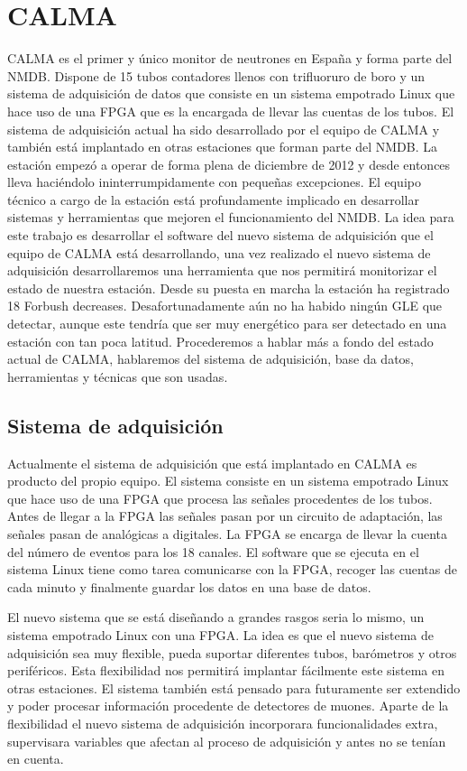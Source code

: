 \section{CALMA}
	CALMA\cite{Medina2013} es el primer y único monitor de neutrones en España y forma parte del NMDB. Dispone de 15 tubos contadores llenos con trifluoruro 
	de boro y un sistema de adquisición de datos que consiste en un sistema empotrado Linux que hace uso de una FPGA que es la encargada de 
	llevar las cuentas de los tubos. El sistema de adquisición actual ha sido desarrollado por el equipo de CALMA y también está implantado en 
	otras estaciones que forman parte del NMDB. La estación empezó a operar de forma plena de diciembre de 2012 y desde entonces lleva haciéndolo 
	ininterrumpidamente con pequeñas excepciones. El equipo técnico a cargo de la estación está profundamente implicado en desarrollar sistemas y herramientas 
	que mejoren el funcionamiento del NMDB. La idea para este trabajo es desarrollar el software del nuevo sistema de adquisición que el equipo 
	de CALMA está desarrollando, una vez realizado el nuevo sistema de adquisición desarrollaremos una herramienta que nos permitirá monitorizar 
	el estado de nuestra estación.
	Desde su puesta en marcha la estación ha registrado 18 Forbush decreases. Desafortunadamente aún no ha habido ningún GLE que detectar, aunque este
	tendría que ser muy energético para ser detectado en una estación con tan poca latitud. 
	Procederemos a hablar más a fondo del estado actual de CALMA, hablaremos del sistema de adquisición, base da datos, herramientas y técnicas
	que son usadas.
	\subsection{Sistema de adquisición}
		Actualmente el sistema de adquisición que está implantado en CALMA es producto del propio equipo\cite{Garcia2014}. El sistema consiste en un sistema empotrado
		Linux que hace uso de una FPGA que procesa las señales procedentes de los tubos. Antes de llegar a la FPGA las señales pasan por un circuito 
		de adaptación, las señales pasan de analógicas a digitales. La FPGA se encarga de llevar la cuenta del número de eventos para los 18 canales. El 
		software que se ejecuta en el sistema Linux tiene como tarea comunicarse con la FPGA, recoger las cuentas de cada minuto y finalmente guardar los
		datos en una base de datos.  
		\par 
		El nuevo sistema que se está diseñando a grandes rasgos seria lo mismo, un sistema empotrado Linux con una FPGA. La idea es que el nuevo sistema
		de adquisición sea muy flexible, pueda suportar diferentes tubos, barómetros y otros periféricos. Esta flexibilidad nos permitirá implantar 
		fácilmente este sistema en otras estaciones. El sistema también está pensado para futuramente ser extendido y poder procesar información 
		procedente de detectores de muones. Aparte de la flexibilidad el nuevo sistema de adquisición incorporara funcionalidades extra, supervisara
		variables que afectan al proceso de adquisición y antes no se tenían en cuenta.
